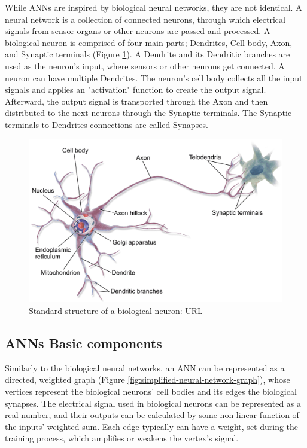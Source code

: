 While ANNs are inspired by biological neural networks, they are not identical. A neural network is a collection of connected neurons, through which electrical signals from sensor organs or other neurons are passed and processed. A biological neuron is comprised of four main parts; Dendrites, Cell body, Axon, and Synaptic terminals (Figure \ref{fig:Standard-structure-of-a-biological-neuron}). A Dendrite and its Dendritic branches are used as the neuron's input, where sensors or other neurons get connected. A neuron can have multiple Dendrites. The neuron's cell body collects all the input signals and applies an "activation" function to create the output signal. Afterward, the output signal is transported through the Axon and then distributed to the next neurons through the Synaptic terminals. The Synaptic terminals to Dendrites connections are called Synapses.

\begin{figure} [ht]
	\centering
	\includegraphics[scale=0.25]{Images/Biological-Neuron.png}
	\decoRule
	\caption[Standard structure of a biological neuron]{Standard structure of a biological neuron: \href{https://nurseslabs.com/nervous-system/}{URL}}
	\label{fig:Standard-structure-of-a-biological-neuron}
\end{figure}

\subsection{ANNs Basic components} \label{subsection:ANNs-Basic-components}
Similarly to the biological neural networks, an ANN can be represented as a directed, weighted graph (Figure \ref{fig:simplified-neural-network-graph}), whose vertices represent the biological neurons' cell bodies and its edges the biological synapses. The electrical signal used in biological neurons can be represented as a real number, and their outputs can be calculated by some non-linear function of the inputs' weighted sum. Each edge typically can have a weight, set during the training process, which amplifies or weakens the vertex's signal.

